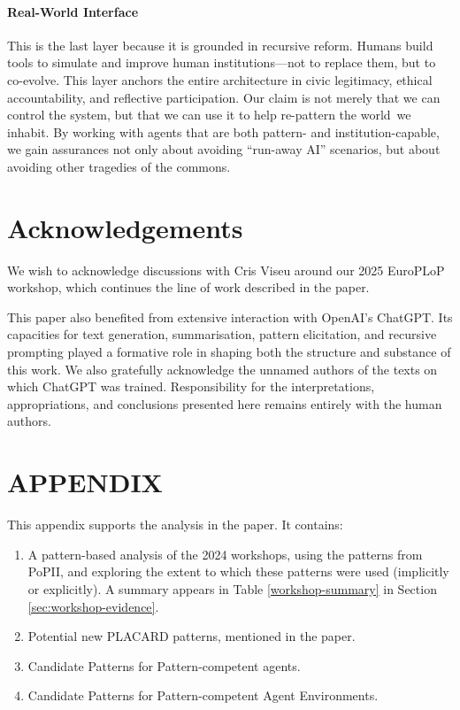 \documentclass[acmlarge,timestamp]{acmart}
\begin{document}
{\paragraph{Real-World Interface}

This is the last layer because it is grounded in recursive reform.
Humans build tools to simulate and improve human institutions---not to
replace them, but to co-evolve.  This layer anchors the entire
architecture in civic legitimacy, ethical accountability, and
reflective participation. Our claim is not merely that we can control
the system, but that we can use it to help re-pattern the world~we
inhabit.  By working with agents that are both pattern- and
institution-capable, we gain assurances not only about avoiding
``run-away AI'' scenarios, but about avoiding other tragedies of the
commons.

\section{Acknowledgements}\label{sec:ack}
We wish to acknowledge discussions with Cris Viseu around our 2025
EuroPLoP workshop, which continues the line of work described in the
paper.

This paper also benefited from extensive interaction with OpenAI’s
ChatGPT.  Its capacities for text generation, summarisation, pattern
elicitation, and recursive prompting played a formative role in
shaping both the structure and substance of this work.  We also
gratefully acknowledge the unnamed authors of the texts on which
ChatGPT was trained.  Responsibility for the interpretations,
appropriations, and conclusions presented here remains entirely with
the human authors.



\section*{APPENDIX}

This appendix supports the analysis in the paper. It contains:

\begin{enumerate}
\item A pattern-based analysis of the 2024 workshops, using the patterns from PoPII, and exploring the extent to which these patterns were used (implicitly or explicitly).  A summary appears in Table \ref{workshop-summary} in Section \ref{sec:workshop-evidence}.
\item Potential new PLACARD patterns, mentioned in the paper.
\item Candidate Patterns for Pattern-competent agents.
\item Candidate Patterns for Pattern-competent Agent Environments.
\end{enumerate}

}
\end{document}
